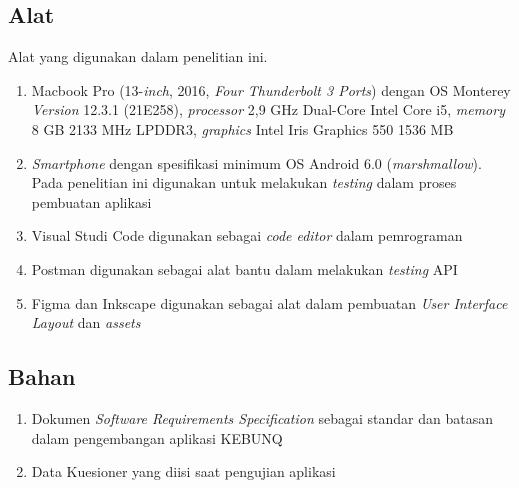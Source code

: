 \begin{flushleft}
\begin{justify}
         \subsection{Alat}
         Alat yang digunakan dalam penelitian ini.
         \begin{enumerate}
            \item Macbook Pro (13-\textit{inch}, 2016, \textit{Four Thunderbolt 3 Ports}) dengan OS Monterey \textit{Version} 12.3.1 (21E258), \textit{processor} 2,9 GHz Dual-Core Intel Core i5, \textit{memory} 8 GB 2133 MHz LPDDR3, \textit{graphics} Intel Iris Graphics 550 1536 MB
            \item \textit{Smartphone} dengan spesifikasi minimum OS Android 6.0 (\textit{marshmallow}). Pada penelitian ini digunakan untuk melakukan \textit{testing} dalam proses pembuatan aplikasi
            \item Visual Studi Code digunakan sebagai \textit{code editor} dalam pemrograman
            \item Postman digunakan sebagai alat bantu dalam melakukan \textit{testing} API
            \item Figma dan Inkscape digunakan sebagai alat dalam pembuatan \textit{User Interface Layout} dan \textit{assets}\\
         \end{enumerate}
         \subsection{Bahan}
         \begin{enumerate}
            \item Dokumen \textit{Software Requirements Specification} sebagai standar dan batasan dalam pengembangan aplikasi KEBUNQ
            \item Data Kuesioner yang diisi saat pengujian aplikasi\\
         \end{enumerate}

\end{justify}
\end{flushleft}
